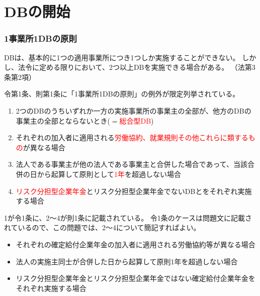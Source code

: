 \section{DBの開始}

\subsubsection{1事業所1DBの原則}

\begin{itembox}[l]{}
  DBは、基本的に1つの適用事業所につき1つしか実施することができない。
  しかし、法令に定める限りにおいて、2つ以上DBを実施できる場合がある。
  （法第3条第2項）

  令第1条、則第1条に「1事業所1DBの原則」の例外が限定列挙されている。
  \begin{enumerate}
    \item 2つのDBのうちいずれか一方の実施事業所の事業主の全部が、他方のDBの事業主の全部とならないとき($=$\textcolor{red}{総合型DB})
    \item それぞれの加入者に適用される\textcolor{red}{労働協約、就業規則その他これらに類するもの}が異なる場合
    \item 法人である事業主が他の法人である事業主と合併した場合であって、当該合併の日から起算して原則として\textcolor{red}{1年}を超過しない場合
    \item \textcolor{red}{リスク分担型企業年金}とリスク分担型企業年金でないDBとをそれぞれ実施する場合
  \end{enumerate}

  1が令1条に、2〜4が則1条に記載されている。
  令1条のケースは問題文に記載されているので、この問題では、2〜4について簡記すればよい。

\end{itembox}

\begin{sol}

  \;

  \begin{itemize}
    \item それぞれの確定給付企業年金の加入者に適用される労働協約等が異なる場合
    \item 法人の実施主同士が合併した日から起算して原則1年を超過しない場合
    \item リスク分担型企業年金とリスク分担型企業年金ではない確定給付企業年金をそれぞれ実施する場合
  \end{itemize}

\end{sol}



\newpage
